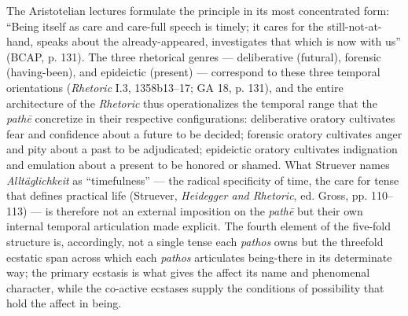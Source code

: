 \documentclass{article}
\begin{document}
The Aristotelian lectures formulate the principle in its most concentrated form: ``Being itself as care and care-full speech is timely; it cares for the still-not-at-hand, speaks about the already-appeared, investigates that which is now with us'' (BCAP, p. 131). The three rhetorical genres --- deliberative (futural), forensic (having-been), and epideictic (present) --- correspond to these three temporal orientations (\textit{Rhetoric} I.3, 1358b13--17; GA 18, p. 131), and the entire architecture of the \textit{Rhetoric} thus operationalizes the temporal range that the \textit{pathē} concretize in their respective configurations: deliberative oratory cultivates fear and confidence about a future to be decided; forensic oratory cultivates anger and pity about a past to be adjudicated; epideictic oratory cultivates indignation and emulation about a present to be honored or shamed. What Struever names \textit{Alltäglichkeit} as ``timefulness'' --- the radical specificity of time, the care for tense that defines practical life (Struever, \textit{Heidegger and Rhetoric}, ed. Gross, pp. 110--113) --- is therefore not an external imposition on the \textit{pathē} but their own internal temporal articulation made explicit. The fourth element of the five-fold structure is, accordingly, not a single tense each \textit{pathos} owns but the threefold ecstatic span across which each \textit{pathos} articulates being-there in its determinate way; the primary ecstasis is what gives the affect its name and phenomenal character, while the co-active ecstases supply the conditions of possibility that hold the affect in being.
\end{document}

